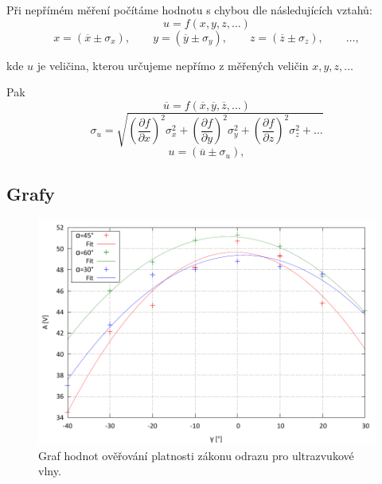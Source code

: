 \documentclass[english]{article}
\begin{document}
	Při nepřímém měření počítáme hodnotu s chybou dle následujících vztahů:
	\begin{equation}
	u = f(x, y, z, \ldots)
	\end{equation}
	\begin{displaymath}
	x = (\overline{x} \pm \sigma_x), \qquad
	y = (\overline{y} \pm \sigma_y), \qquad
	z = (\overline{z} \pm \sigma_z), \qquad
	\ldots,
	\end{displaymath}
	
	kde $ u $ je veličina, kterou určujeme nepřímo z měřených veličin $ x, y, z, \ldots $ 
	
	Pak
	\begin{displaymath}
	\overline{u} = f(\overline{x}, \overline{y}, \overline{z}, \ldots)
	\end{displaymath}
	\begin{equation}\label{eq:chyba_neprime_mereni}
	\sigma_u = \sqrt{\left( \frac{\partial f}{\partial x} \right)^2 \sigma^2_x + \left( \frac{\partial f}{\partial y} \right)^2 \sigma^2_y + \left( \frac{\partial f}{\partial z} \right)^2 \sigma^2_z + \ldots}
	\end{equation}
	\begin{displaymath}
	u = (\overline{u} \pm \sigma_ u),
	\end{displaymath}
\newpage
\subsection{Grafy}
	
	\begin{figure}[h]
	\begin{center}
		\includegraphics[width=\linewidth]{../gnuplot/8_sonar_zk_out.pdf}
		\caption{Graf hodnot ověřování platnosti zákonu odrazu pro ultrazvukové vlny.}
		\label{fig:g_zakon_odrazu}
	\end{center}
	\end{figure}
	
\end{document}
